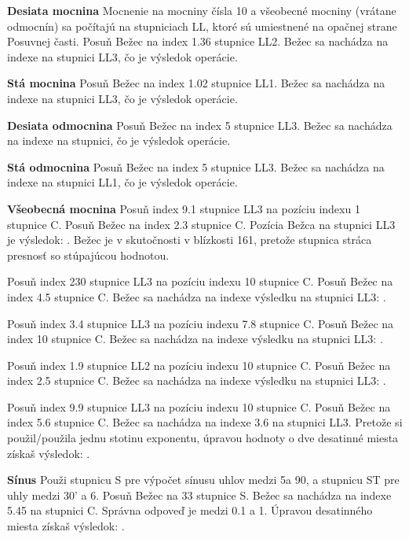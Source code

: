 \begin{multicols*}{3}
{  \textbf{Desiata mocnina}
\footnotesize Mocnenie na mocniny čísla 10 a všeobecné mocniny (vrátane odmocnín) sa počítajú na stupniciach LL, ktoré sú umiestnené na opačnej strane Posuvnej časti. \normalsize
Posuň Bežec na index 1.36 stupnice LL2.
Bežec sa nachádza na indexe  na stupnici LL3, čo je výsledok operácie.

  \textbf{Stá mocnina}
Posuň Bežec na index 1.02 stupnice LL1.
Bežec sa nachádza na indexe  na stupnici LL3, čo je výsledok operácie.

  \textbf{Desiata odmocnina}
Posuň Bežec na index 5 stupnice LL3.
Bežec sa nachádza na indexe  na stupnici, čo je výsledok operácie.

  \textbf{Stá odmocnina}
Posuň Bežec na index 5 stupnice LL3.
Bežec sa nachádza na indexe  na stupnici LL1, čo je výsledok operácie.

  \textbf{Všeobecná mocnina}
Posuň index 9.1 stupnice LL3 na pozíciu indexu 1 stupnice C.
Posuň Bežec na index 2.3 stupnice C.
Pozícia Bežca na stupnici LL3 je výsledok: . Bežec je v skutočnosti v blízkosti 161, pretože stupnica stráca presnosť so stúpajúcou hodnotou. 

Posuň index 230 stupnice LL3 na pozíciu indexu 10 stupnice C.
Posuň Bežec na index 4.5 stupnice C.
Bežec sa nachádza na indexe výsledku na stupnici LL3: .

Posuň index 3.4 stupnice LL3 na pozíciu indexu 7.8 stupnice C.
Posuň Bežec na index 10 stupnice C.
Bežec sa nachádza na indexe výsledku na stupnici LL3: .

Posuň index 1.9 stupnice LL2 na pozíciu indexu 10 stupnice C.
Posuň Bežec na index 2.5 stupnice C.
Bežec sa nachádza na indexe výsledku na stupnici LL3: .

Posuň index 9.9 stupnice LL3 na pozíciu indexu 10 stupnice C.
Posuň Bežec na index 5.6 stupnice C.
Bežec sa nachádza na indexe 3.6 na stupnici LL3.
Pretože si použil/použila jednu stotinu exponentu, úpravou hodnoty o dve desatinné miesta získaš výsledok: .

  \textbf{Sínus}
\footnotesize Použi stupnicu S pre výpočet sínusu uhlov medzi 5\textdegree a 90\textdegree, a stupnicu ST pre uhly medzi 30' a 6\textdegree. \normalsize
{}
Posuň Bežec na 33 stupnice S.
Bežec sa nachádza na indexe 5.45 na stupnici C.
Správna odpoveď je medzi 0.1 a 1. Úpravou desatinného miesta získaš výsledok: .

}
\end{multicols*}
